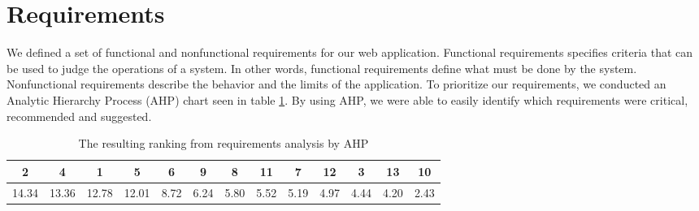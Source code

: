 \section{Requirements}
We defined a set of functional and nonfunctional requirements for our web application. Functional requirements specifies criteria that can be used to judge the operations of a system. In other words, functional requirements define what must be done by the system. Nonfunctional requirements describe the behavior and the limits of the application. To prioritize our requirements, we conducted an Analytic Hierarchy Process (AHP) chart seen in table \ref{ahp}. By using AHP, we were able to easily identify which requirements were critical, recommended and suggested.
\FloatBarrier
\begin{table}
\begin{tabular}{c|c|c|c|c|c|c|c|c|c|c|c|c}
	2 & 4 & 1 & 5 & 6 & 9 & 8 & 11 & 7 & 12 & 3 & 13 & 10 \\
	\hline
	14.34 & 13.36 & 12.78 & 12.01 & 8.72 & 6.24 & 5.80 & 5.52 & 5.19 & 4.97 & 4.44 & 4.20 & 2.43 \\
\end{tabular}
\caption{The resulting ranking from requirements analysis by AHP}
\label{ahp}
\end{table}
\FloatBarrier

